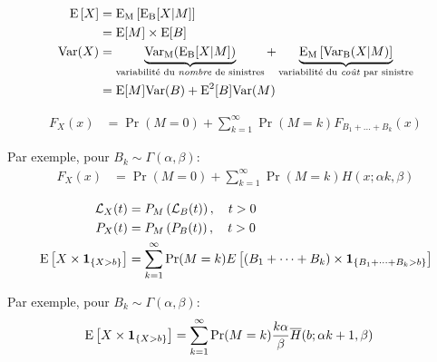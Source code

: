 \documentclass[10pt, french]{article}
\begin{document}
\begin{multicols*}{2}
\begin{definitionNOHFILL}
\tcbline

\begin{align*}
	\mathrm{E} \left[ X \right]
	&=	\text{E}_{\text{M}}\left[\text{E}_{\text{B}}[X | M]\right]	\\
	&=	\text{E}[M]	\times	\text{E}[B]	\\
	\text{Var}(X)
	&=	\underbrace{\text{Var}_{\text{M}}(\text{E}_{\text{B}}[X | M])}_{\text{variabilité du \textit{nombre} de sinistres}}	+	\underbrace{\text{E}_{\text{M}}\left[\text{Var}_{\text{B}}(X | M)\right]}_{\text{variabilité du \textit{coût} par sinistre}}	\\
	&=	\text{E}[M]\text{Var}(B)	+	\text{E}^{2}[B]\text{Var}(M)	\\
\end{align*}

\tcbline

\begin{align*}
	F_{X}(x)
	&=	\Pr(M	=	0)	+	\sum_{k	=	1}^{\infty} \Pr(M	=	k)F_{B_{1}	+	\dots	+	B_{k}}(x)
\end{align*}

Par exemple, pour $B_{k}	\sim	\Gamma(\alpha,	\beta)$:
\begin{align*}
	F_{X}(x)
	&=	\Pr(M	=	0)	+	\sum_{k	=	1}^{\infty} \Pr(M	=	k)H(x;	\alpha k, \beta)
\end{align*}

\tcbline

\begin{align*}
	\mathcal{L}_{X}(t)
	&=	P_{M}\left(\mathcal{L}_{B}(t)\right), \quad	t > 0	\\
	P_{X}(t)
	&=	P_{M}\left(P_{B}(t)\right), \quad	t > 0	\\
	\mathrm{E} \left[ X	\times	\bm{1}_{\{X	>	b\}} \right]
	&=	\sum_{k	=	1}^{\infty} \Pr(M	=	k)E\left[(B_{1}	+	\dots	+	B_{k})	\times	\bm{1}_{\{B_{1}	+	\dots	+	B_{k} > b\}}\right]
\end{align*}

Par exemple, pour $B_{k}	\sim	\Gamma(\alpha,	\beta)$:
\begin{align*}
	\mathrm{E} \left[ X	\times	\bm{1}_{\{X	>	b\}} \right]
	&=	\sum_{k	=	1}^{\infty} \Pr(M	=	k) \frac{k\alpha}{\beta} \overline{H}(b;	\alpha k + 1, \beta)
\end{align*}
\end{definitionNOHFILL}


\end{multicols*}
\end{document}
